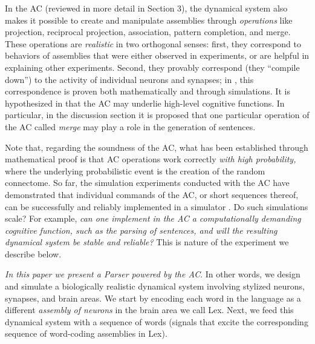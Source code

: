 In the AC (reviewed in more detail in Section 3), the dynamical system also makes it possible to create and manipulate assemblies through {\em operations} like projection, reciprocal projection, association, pattern completion, and merge. 
These operations are {\em realistic} in two orthogonal senses: first, they correspond to behaviors of assemblies that were either observed in experiments, or are helpful in explaining other experiments. Second, they provably correspond (they ``compile down'') to the activity of individual neurons and synapses; in \citet{PNAS}, this correspondence is proven both mathematically and through simulations. It is hypothesized in \citet{PNAS} that the AC may underlie high-level cognitive functions.  In particular, in the discussion section it is proposed that one particular operation of the AC called {\em merge} may play a role in the generation of sentences.

Note that, regarding the soundness of the AC, what has been established through mathematical proof is that AC operations work correctly {\em with high probability,} where the underlying probabilistic event is the creation of the random connectome.  So far, the simulation experiments conducted with the AC have demonstrated that individual commands of the AC, or short sequences thereof, can be successfully and reliably implemented in a simulator \cite{PNAS}.  Do such simulations scale?  For example, {\em can one implement in the AC a computationally demanding cognitive function, such as the parsing of sentences, and will the resulting dynamical system be stable and reliable?}  This is nature of the experiment we describe below.


{\em In this paper we present a Parser powered by the AC}.  In other words, we design and simulate a biologically realistic dynamical system involving stylized neurons, synapses, and brain areas. We start by encoding each word in the language as a different {\em assembly of neurons} in the brain area we call {\sc Lex}. Next, we feed this dynamical system with a sequence of words (signals that excite the corresponding sequence of word-coding assemblies in {\sc Lex}).  

